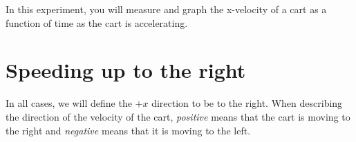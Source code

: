 

\apparatus


\longgoal

In this experiment, you will measure and graph the x-velocity of a cart as a function of time as the cart is accelerating.

\section*{Speeding up to the right}

\procedure

In all cases, we will define the $+x$ direction to be to the right. When describing the direction of the velocity of the cart, \emph{positive} means that the cart is moving to the right and \emph{negative} means that it is moving to the left.


